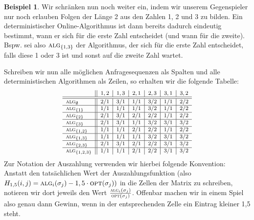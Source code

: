 \documentclass[a4paper,ngerman,12pt,bibtotoc]{scrartcl}
\theoremstyle{definition}
\newtheorem{bsp}[defn]{Beispiel}
\theoremstyle{plain}
\theoremstyle{remark}
\renewcommand{\_}{\mathpunct{.}\,}
\newcommand{\?}{\,{:}\,}
\newcommand{\Alg}{\ensuremath{\textsc{alg}}}
\newcommand{\Opt}{\ensuremath{\textsc{opt}}}
\newcommand{\Hf}{H}
\begin{document}
	\begin{bsp}\label{bsp:Teil3}
		Wir schränken nun  noch weiter ein, indem wir unserem Gegenspieler nur noch erlauben Folgen der Länge 2 aus den Zahlen 1, 2 und 3 zu bilden. Ein deterministischer Online-Algorithmus ist dann bereits dadurch eindeutig bestimmt, wann er sich für die erste Zahl entscheidet (und wann für die zweite). Bspw. sei also $\Alg_{\{1,3\}}$ der Algorithmus, der sich für die erste Zahl entscheidet, falls diese 1 oder 3 ist und sonst auf die zweite Zahl wartet.
		
		Schreiben wir nun alle möglichen Anfragesequenzen als Spalten und alle deterministischen Algorithmen als Zeilen, so erhalten wir die folgende Tabelle:
		\def\arraystretch{1.5}
		\[\footnotesize\begin{array}{l||c|c|c|c|c|c}
		& 1,2 & 1,3	& 2,1 & 2,3 & 3,1 & 3,2 \\\hline\hline
		\Alg_\emptyset 	& 2/1 & 3/1	& 1/1 & 3/2	& 1/1 & 2/2	\\\hline
		\Alg_{\{1\}}	& 1/1 & 1/1 & 1/1 & 3/2 & 1/1 & 2/2 \\\hline
		\Alg_{\{2\}}	& 2/1 & 3/1 & 2/1 & 2/2 & 1/1 & 2/2 \\\hline
		\Alg_{\{3\}}	& 2/1 & 3/1 & 1/1 & 3/2 & 3/1 & 3/2 \\\hline
		\Alg_{\{1,2\}}	& 1/1 & 1/1 & 2/1 & 2/2 & 1/1 & 2/2 \\\hline
		\Alg_{\{1,3\}}	& 1/1 & 1/1 & 1/1 & 3/2 & 3/1 & 3/2 \\\hline
		\Alg_{\{2,3\}}	& 2/1 & 3/1 & 2/1 & 2/2 & 3/1 & 3/2 \\\hline
		\Alg_{\{1,2,3\}}& 1/1 & 1/1 & 2/1 & 2/2 & 3/1 & 3/2
		\end{array}\]
		Zur Notation der Auszahlung verwenden wir hierbei folgende Konvention: Anstatt den tatsächlichen Wert der Auszahlungsfunktion (also $\Hf_{1,5}(i,j) = \Alg_i(\sigma_j) - 1,5\cdot\Opt(\sigma_j))$ in die Zellen der Matrix zu schreiben, notieren wir dort jeweils den Wert $\frac{\Alg_i(\sigma_j)}{\Opt(\sigma_j)}$. Offenbar machen wir in einem Spiel also genau dann Gewinn, wenn in der entsprechenden Zelle ein Eintrag kleiner 1,5 steht.
		

\end{bsp}
\end{document}
